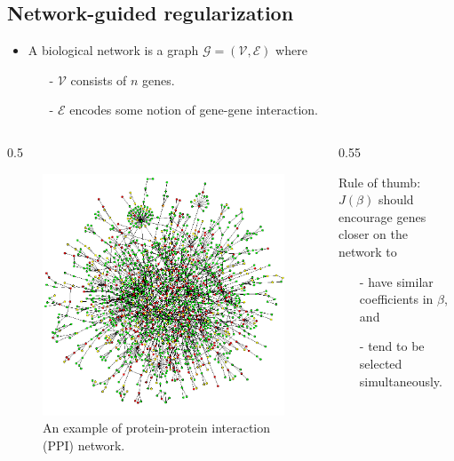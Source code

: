 \documentclass[xcolor=x11names,compress]{beamer}
\theoremstyle{plain}
\renewcommand{\(}{\begin{columns}}
\renewcommand{\)}{\end{columns}}
\newcommand{\<}[1]{\begin{column}{#1}}
\renewcommand{\>}{\end{column}}
\begin{document}
\subsection{Network-guided regularization}
\begin{frame}{\insertsubsection}
	
	\begin{itemize}
		\item A biological network is a graph $\mathcal{G} = (\mathcal{V}, \mathcal{E})$ where
		\begin{itemize}
			\item[-] $\mathcal{V}$ consists of $n$ genes.
			\item[-] $\mathcal{E}$ encodes some notion of gene-gene interaction.
		\end{itemize}
	\end{itemize}
	
	\vskip -0.1in
	
	\(
	\<{0.5\linewidth}
	\begin{figure}
	\begin{center}
		\includegraphics[width=0.9\columnwidth]{slides/ppi}
		\vskip -0.1in
		\caption{An example of protein-protein interaction (PPI) network.}
	\end{center}
	\end{figure}
	\>
	\hskip -0.3cm
	\<{0.55\linewidth}
	\begin{framed}
	\alert{Rule of thumb:}\\
	$J(\beta)$ should encourage genes closer on the network to
	\begin{itemize}
		\item[-] have similar coefficients in $\beta$, and
		\item[-] tend to be selected simultaneously.
	\end{itemize}
	\end{framed}
	\>
	\)
	
\end{frame}
\end{document}
